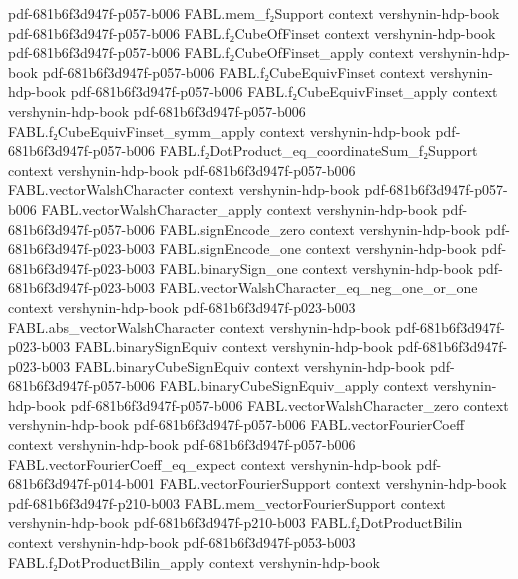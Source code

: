 \begin{theorem}
  {pdf-681b6f3d947f-p057-b006}
\proofstep
  {FABL.mem_f₂Support}
  {context}
  {vershynin-hdp-book}
  {pdf-681b6f3d947f-p057-b006}
\proofstep
  {FABL.f₂CubeOfFinset}
  {context}
  {vershynin-hdp-book}
  {pdf-681b6f3d947f-p057-b006}
\proofstep
  {FABL.f₂CubeOfFinset_apply}
  {context}
  {vershynin-hdp-book}
  {pdf-681b6f3d947f-p057-b006}
\proofstep
  {FABL.f₂CubeEquivFinset}
  {context}
  {vershynin-hdp-book}
  {pdf-681b6f3d947f-p057-b006}
\proofstep
  {FABL.f₂CubeEquivFinset_apply}
  {context}
  {vershynin-hdp-book}
  {pdf-681b6f3d947f-p057-b006}
\proofstep
  {FABL.f₂CubeEquivFinset_symm_apply}
  {context}
  {vershynin-hdp-book}
  {pdf-681b6f3d947f-p057-b006}
\proofstep
  {FABL.f₂DotProduct_eq_coordinateSum_f₂Support}
  {context}
  {vershynin-hdp-book}
  {pdf-681b6f3d947f-p057-b006}
\proofstep
  {FABL.vectorWalshCharacter}
  {context}
  {vershynin-hdp-book}
  {pdf-681b6f3d947f-p057-b006}
\proofstep
  {FABL.vectorWalshCharacter_apply}
  {context}
  {vershynin-hdp-book}
  {pdf-681b6f3d947f-p057-b006}
\proofstep
  {FABL.signEncode_zero}
  {context}
  {vershynin-hdp-book}
  {pdf-681b6f3d947f-p023-b003}
\proofstep
  {FABL.signEncode_one}
  {context}
  {vershynin-hdp-book}
  {pdf-681b6f3d947f-p023-b003}
\proofstep
  {FABL.binarySign_one}
  {context}
  {vershynin-hdp-book}
  {pdf-681b6f3d947f-p023-b003}
\proofstep
  {FABL.vectorWalshCharacter_eq_neg_one_or_one}
  {context}
  {vershynin-hdp-book}
  {pdf-681b6f3d947f-p023-b003}
\proofstep
  {FABL.abs_vectorWalshCharacter}
  {context}
  {vershynin-hdp-book}
  {pdf-681b6f3d947f-p023-b003}
\proofstep
  {FABL.binarySignEquiv}
  {context}
  {vershynin-hdp-book}
  {pdf-681b6f3d947f-p023-b003}
\proofstep
  {FABL.binaryCubeSignEquiv}
  {context}
  {vershynin-hdp-book}
  {pdf-681b6f3d947f-p057-b006}
\proofstep
  {FABL.binaryCubeSignEquiv_apply}
  {context}
  {vershynin-hdp-book}
  {pdf-681b6f3d947f-p057-b006}
\proofstep
  {FABL.vectorWalshCharacter_zero}
  {context}
  {vershynin-hdp-book}
  {pdf-681b6f3d947f-p057-b006}
\proofstep
  {FABL.vectorFourierCoeff}
  {context}
  {vershynin-hdp-book}
  {pdf-681b6f3d947f-p057-b006}
\proofstep
  {FABL.vectorFourierCoeff_eq_expect}
  {context}
  {vershynin-hdp-book}
  {pdf-681b6f3d947f-p014-b001}
\proofstep
  {FABL.vectorFourierSupport}
  {context}
  {vershynin-hdp-book}
  {pdf-681b6f3d947f-p210-b003}
\proofstep
  {FABL.mem_vectorFourierSupport}
  {context}
  {vershynin-hdp-book}
  {pdf-681b6f3d947f-p210-b003}
\proofstep
  {FABL.f₂DotProductBilin}
  {context}
  {vershynin-hdp-book}
  {pdf-681b6f3d947f-p053-b003}
\proofstep
  {FABL.f₂DotProductBilin_apply}
  {context}
  {vershynin-hdp-book}

\end{theorem}
